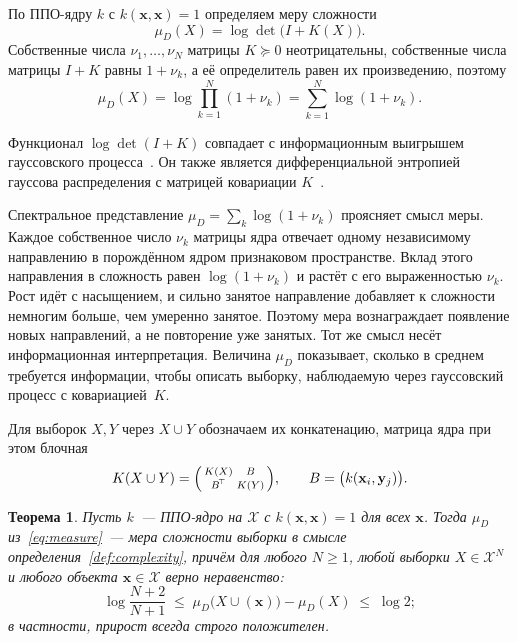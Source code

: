 \documentclass[14pt, a4paper]{extarticle}
\theoremstyle{definition}
\theoremstyle{plain}
\newtheorem{theorem}[definition]{Теорема}
\begin{document}
По ППО-ядру $k$ с $k(\mathbf{x},\mathbf{x})=1$ определяем меру сложности
\begin{equation}
    \mu_D(X)=\log\det\big(I+K(X)\big).
    \label{eq:measure}
\end{equation}
Собственные числа $\nu_1,\dots,\nu_N$ матрицы $K\succeq0$ неотрицательны,
собственные числа матрицы $I+K$ равны $1+\nu_k$, а её определитель равен их
произведению, поэтому
\[
    \mu_D(X)=\log\prod_{k=1}^N(1+\nu_k)=\sum_{k=1}^N\log(1+\nu_k).
\]

Функционал $\log\det(I+K)$ совпадает с информационным выигрышем гауссовского
процесса~\cite{KrauseSinghGuestrin2008Sensor,SrinivasKrauseKakadeSeeger2010GPUCB}.
Он также является дифференциальной энтропией гауссова
распределения с матрицей ковариации $K$~\cite{CoverThomas2006}.

Спектральное представление $\mu_D=\sum_k\log(1+\nu_k)$ проясняет смысл меры.
Каждое собственное число $\nu_k$ матрицы ядра отвечает одному независимому
направлению в порождённом ядром признаковом пространстве. Вклад этого направления
в сложность равен $\log(1+\nu_k)$ и растёт с его выраженностью $\nu_k$. Рост идёт с
насыщением, и сильно занятое направление добавляет к сложности немногим больше, чем
умеренно занятое. Поэтому мера вознаграждает появление новых направлений, а не
повторение уже занятых. Тот же смысл несёт информационная интерпретация. Величина
$\mu_D$ показывает, сколько в среднем требуется информации, чтобы описать выборку,
наблюдаемую через гауссовский процесс с ковариацией~$K$.

Для выборок $X,Y$
через $X\cup Y$ обозначаем их конкатенацию, матрица ядра
при этом блочная
\[
    K(X\cup Y)=\begin{psmallmatrix}K(X)&B\\ B^{\!\top}&K(Y)\end{psmallmatrix},
    \qquad B=\big(k(\mathbf{x}_i,\mathbf{y}_j)\big).
\]

\begin{theorem}
\label{thm:valid}
Пусть $k$~--- ППО-ядро на $\mathcal{X}$ с $k(\mathbf{x},\mathbf{x})=1$ для всех
$\mathbf{x}$. Тогда $\mu_D$ из~\eqref{eq:measure}~--- мера сложности выборки в смысле
определения~\ref{def:complexity}, причём для
любого $N\ge1$, любой выборки $X\in\mathcal{X}^N$ и любого объекта
$\mathbf{x}\in\mathcal{X}$ верно неравенство:
\[
    \log\frac{N+2}{N+1}
    \;\le\;\mu_D\big(X\cup(\mathbf{x})\big)-\mu_D(X)\;\le\;\log 2 ;
\]
в частности, прирост всегда строго положителен.
\end{theorem}
\end{document}
